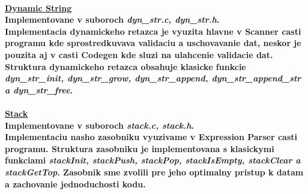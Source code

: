 \documentclass[12pt]{article}
\begin{document}
\paragraph{\large \underline{Dynamic String} \\ Implementovane v suboroch \textit{dyn\_str.c, dyn\_str.h}. \\ \newline
Implementacia dynamickeho retazca je vyuzita hlavne v Scanner casti programu kde sprostredkuvava validaciu a uschovavanie dat, neskor je pouzita aj v casti Codegen kde sluzi na ulahcenie validacie dat. Struktura dynamickeho retazca obsahuje klasicke funkcie \textit{dyn\_str\_init, dyn\_str\_grow, dyn\_str\_append, dyn\_str\_append\_str a dyn\_str\_free}.  
\newline \\}

\paragraph{\large \underline{Stack} \\ Implementovane v suboroch \textit{stack.c, stack.h}. \\ \newline
Implementaciu nasho zasobniku vyuzivame  v Expression Parser casti programu. Struktura zasobniku je implementovana s klasickymi funkciami \textit{stackInit, stackPush, stackPop, stackIsEmpty, stackClear a stackGetTop}. Zasobnik sme zvolili pre jeho optimalny pristup k datam a zachovanie jednoduchosti kodu.
\newline \\}
\end{document}
